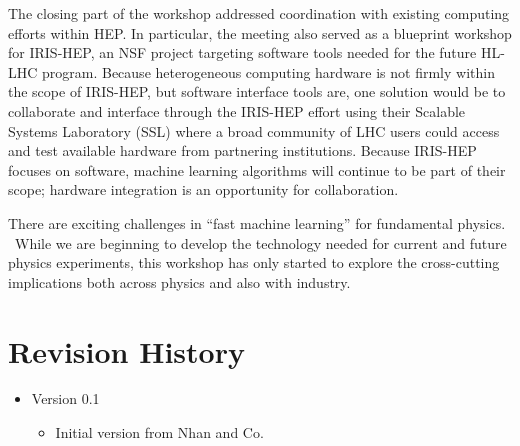 \documentclass[11pt,letterpaper,fleqn]{article}
\begin{document}

The closing part of the workshop addressed coordination with existing computing efforts within HEP. In particular, the meeting also served as a blueprint workshop for IRIS-HEP, an NSF project targeting software tools needed for the future HL-LHC program. Because heterogeneous computing hardware is not firmly within the scope of IRIS-HEP, but software interface tools are, one solution would be to collaborate and interface through the IRIS-HEP effort using their Scalable Systems Laboratory (SSL) where a broad community of LHC users could access and test available hardware from partnering institutions.  Because IRIS-HEP focuses on software, machine learning algorithms will continue to be part of their scope; hardware integration is an opportunity for collaboration.

There are exciting challenges in ``fast machine learning'' for fundamental physics.  While we are beginning to develop the technology needed for current and future physics experiments, this workshop has only started to explore the cross-cutting implications both across physics and also with industry.



\appendix
\newpage
\section{Revision History}

\vspace{8pt}
\begin{itemize}
  \item Version 0.1
  \vspace{-5pt}
  \begin{itemize}
    \item Initial version from Nhan and Co.
  \end{itemize}
\end{itemize}
\end{document}
